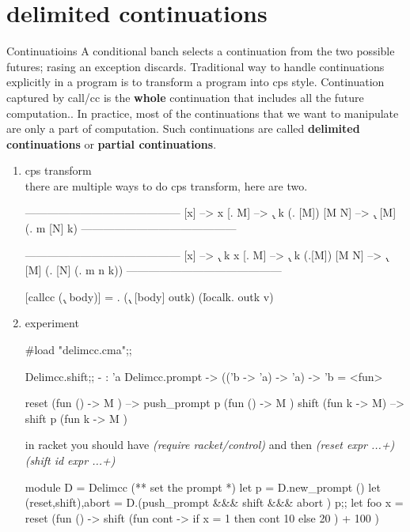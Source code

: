 \section{delimited continuations}
\label{sec:cont-delim-cont}
Continuatioins
A conditional banch selects a continuation from the two possible
futures; rasing an exception discards. Traditional way to handle
continuations explicitly in a program is to transform a program into
cps style. Continuation captured by call/cc is the {\bf whole} continuation
that includes all the future computation.. In practice, most of the
continuations that we want to manipulate are only a part of
computation. Such continuations are called {\bf delimited continuations} or
{\bf partial continuations}.


\begin{enumerate}
\item cps transform \\
  there are multiple ways to do cps transform, here are two.

  
  \begin{bluetext}
------------------------------------------
   [x] --> x
   [\x. M] --> \k . k (\x . [M])
   [M N] --> \k. [M] (\m . m [N] k)
------------------------------------------


------------------------------------------
   [x] --> \k . k x
   [\x. M] --> \k. k (\x.[M])
   [M N] --> \k. [M] (\m . [N] (\n. m n k))
------------------------------------------


[callcc (\k. body)] = \outk. (\k. [body] outk) (\v localk. outk v)
   
  \end{bluetext}

  
\item experiment

\begin{alternate}
#load "delimcc.cma";;
\end{alternate}
\begin{alternate}
Delimcc.shift;;
- : 'a Delimcc.prompt -> (('b -> 'a) -> 'a) -> 'b = <fun>
\end{alternate}

\begin{bluetext}
reset (fun () -> M ) --> push_prompt p (fun () -> M )
shift (fun k -> M) --> shift p (fun k -> M )
\end{bluetext}
in racket you should have \textit{(require racket/control)}
and then \textit{(reset expr ...+)}
\textit{(shift id expr ...+)}


\begin{redcode}
module D = Delimcc
(** set the prompt *)  
let p = D.new_prompt ()
let (reset,shift),abort  = D.(push_prompt &&& shift &&& abort ) p;;
let foo x = reset (fun () -> shift (fun cont -> if x = 1 then cont 10 else 20 ) + 100 )
\end{redcode}


\end{enumerate}
